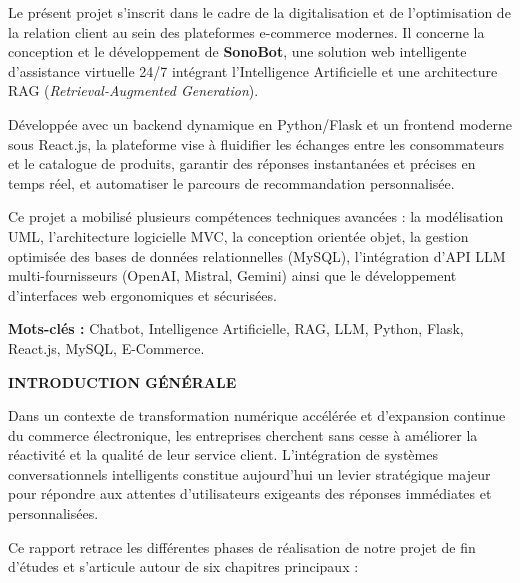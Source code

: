 \documentclass[12pt, a4paper, oneside]{report}
\begin{document}
Le présent projet s’inscrit dans le cadre de la digitalisation et de l’optimisation de la relation client au sein des plateformes e-commerce modernes. Il concerne la conception et le développement de \textbf{SonoBot}, une solution web intelligente d'assistance virtuelle 24/7 intégrant l'Intelligence Artificielle et une architecture RAG (\textit{Retrieval-Augmented Generation}).

Développée avec un backend dynamique en Python/Flask et un frontend moderne sous React.js, la plateforme vise à fluidifier les échanges entre les consommateurs et le catalogue de produits, garantir des réponses instantanées et précises en temps réel, et automatiser le parcours de recommandation personnalisée.

Ce projet a mobilisé plusieurs compétences techniques avancées : la modélisation UML, l'architecture logicielle MVC, la conception orientée objet, la gestion optimisée des bases de données relationnelles (MySQL), l'intégration d'API LLM multi-fournisseurs (OpenAI, Mistral, Gemini) ainsi que le développement d'interfaces web ergonomiques et sécurisées.

\vspace{1cm}
\textbf{Mots-clés :} Chatbot, Intelligence Artificielle, RAG, LLM, Python, Flask, React.js, MySQL, E-Commerce.

\newpage

\vspace*{0.5cm}
\begin{center}
  {\Huge \textbf{INTRODUCTION GÉNÉRALE}}
\end{center}
\vspace{0.8cm}

Dans un contexte de transformation numérique accélérée et d’expansion continue du commerce électronique, les entreprises cherchent sans cesse à améliorer la réactivité et la qualité de leur service client. L'intégration de systèmes conversationnels intelligents constitue aujourd’hui un levier stratégique majeur pour répondre aux attentes d’utilisateurs exigeants des réponses immédiates et personnalisées.

Ce rapport retrace les différentes phases de réalisation de notre projet de fin d'études et s'articule autour de six chapitres principaux :
\end{document}
